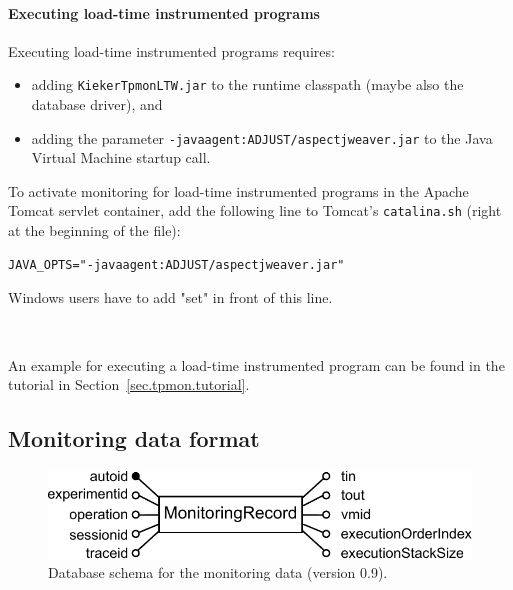 \documentclass[a4paper,12pt]{scrartcl}
\begin{document}
\paragraph{Executing load-time instrumented programs}

Executing load-time instrumented programs requires:
\begin{itemize}
\item adding \texttt{KiekerTpmonLTW.jar} to the runtime classpath (maybe also the database driver), and
\item adding the parameter \texttt{-javaagent:ADJUST/aspectjweaver.jar} to the Java Virtual Machine startup call.
\end{itemize}

To activate monitoring for load-time instrumented programs in the Apache Tomcat servlet container, add the following line to Tomcat's \texttt{catalina.sh} (right at the beginning of the file):
\begin{lstlisting}[caption={}]
JAVA_OPTS="-javaagent:ADJUST/aspectjweaver.jar"
\end{lstlisting}
Windows users have to add "set" in front of this line.

\

An example for executing a load-time instrumented program can be found in the tutorial in Section~\ref{sec.tpmon.tutorial}.

\subsection{Monitoring data format}\label{sec.monitoring.data.format}

\begin{figure}
 \centering
 \includegraphics[width=0.8\columnwidth]{08-05-06-monitoringDataFormat}
 \caption{Database schema for the monitoring data (version 0.9).}
 \label{databaseSchema}
\end{figure}
\end{document}
